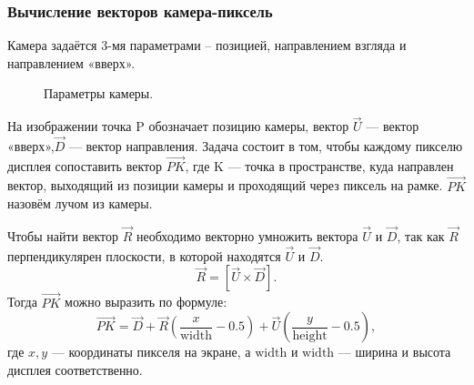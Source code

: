 \documentclass[14pt,a4paper]{extarticle}
\begin{document}
    	\subsubsection*{Вычисление векторов камера-пиксель}
    		Камера задаётся 3-мя параметрами – позицией, направлением взгляда и направлением «вверх».
    		\begin{figure}[H]
    			\noindent{}
    			\caption{Параметры камеры.}
    		\end{figure}
    		На изображении точка P обозначает позицию камеры, вектор $\vec{U}$ --- вектор «вверх»,$\vec{D}$ --- вектор направления.
    		Задача состоит в том, чтобы каждому пикселю дисплея сопоставить вектор $\vec{PK}$, где K --- точка в пространстве, 
    		куда направлен вектор, выходящий из позиции камеры и проходящий через пиксель на рамке. 
    		$\vec{PK}$ назовём лучом из камеры.
    		
    		Чтобы найти вектор $\vec{R}$ необходимо векторно умножить вектора $\vec{U}$ и $\vec{D}$, так как $\vec{R}$ перпендикулярен плоскости, в которой находятся $\vec{U}$ и $\vec{D}$.
    		\begin{equation*}
    			\vec{R} = [\vec{U}\times\vec{D}].
    		\end{equation*}
    		Тогда $\vec{PK}$ можно выразить по формуле:
    		\begin{equation*}
    		\vec{PK} = \vec{D}+\vec{R}(\frac{x}{\mathrm{width}} - 0.5)+\vec{U}(\frac{y}{\mathrm{height}} - 0.5),
    		\end{equation*}
    		где $x, y$ --- координаты пикселя на экране, а $\mathrm{width}$ и $\mathrm{width}$ --- ширина и высота дисплея соответственно.
    		
\end{document}
